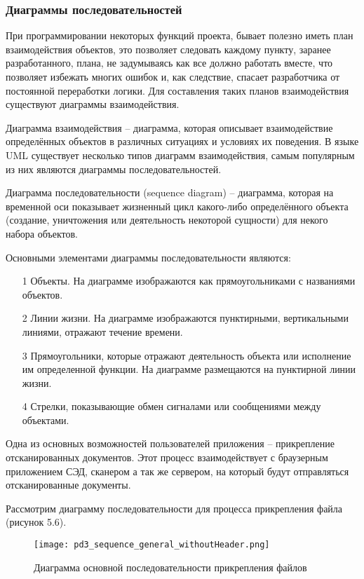 \subsubsection{Диаграммы последовательностей}

При программировании некоторых функций проекта, бывает полезно иметь план взаимодействия объектов, это позволяет следовать каждому пункту, заранее разработанного, плана, не задумываясь как все должно работать вместе, что позволяет избежать многих ошибок и, как следствие, спасает разработчика от постоянной переработки логики. Для составления таких планов взаимодействия существуют диаграммы взаимодействия.

Диаграмма взаимодействия – диаграмма, которая описывает взаимодействие определённых объектов в различных ситуациях и условиях их поведения. В языке UML существует несколько типов диаграмм взаимодействия, самым популярным из них являются диаграммы последовательностей.

Диаграмма последовательности (sequence diagram) – диаграмма, которая на временной оси показывает жизненный цикл какого-либо определённого объекта (создание, уничтожения или деятельность некоторой сущности) для некого набора объектов.

Основными элементами диаграммы последовательности являются:
\begin{enumerate}
	\item[1] Объекты. На диаграмме изображаются как прямоугольниками с названиями объектов.
	\item[2] Линии жизни. На диаграмме изображаются пунктирными, вертикальными линиями, отражают течение времени.
	\item[3] Прямоугольники, которые отражают деятельность объекта или исполнение им определенной функции. На диаграмме размещаются на пунктирной линии жизни.
	\item[4] Стрелки, показывающие обмен сигналами или сообщениями между объектами.
\end{enumerate}

Одна из основных возможностей пользователей приложения – прикрепление отсканированных документов. Этот процесс взаимодействует с браузерным приложением СЭД, сканером а так же сервером, на который будут отправляться отсканированные документы.

Рассмотрим диаграмму последовательности для процесса прикрепления файла (рисунок 5.6).

\begin{figure}[h!]
	\centering
	\texttt{[image: pd3\_sequence\_general\_withoutHeader.png]}
	\caption{Диаграмма основной последовательности прикрепления файлов}
\end{figure}

